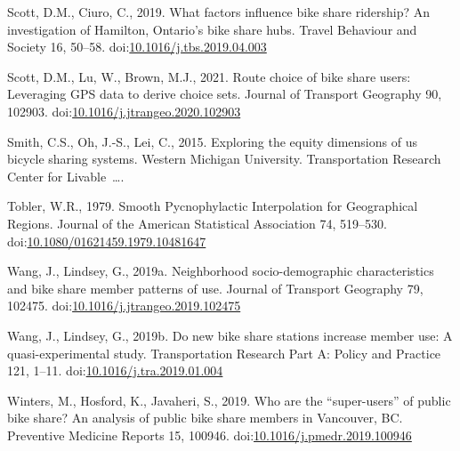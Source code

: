 \documentclass[]{elsarticle} %
\begin{document}
\leavevmode\hypertarget{ref-scottWhatFactorsInfluence2019}{}%
Scott, D.M., Ciuro, C., 2019. What factors influence bike share
ridership? An investigation of Hamilton, Ontario's bike share hubs.
Travel Behaviour and Society 16, 50--58.
doi:\href{https://doi.org/10.1016/j.tbs.2019.04.003}{10.1016/j.tbs.2019.04.003}

\leavevmode\hypertarget{ref-scottRouteChoiceBike2021}{}%
Scott, D.M., Lu, W., Brown, M.J., 2021. Route choice of bike share
users: Leveraging GPS data to derive choice sets. Journal of Transport
Geography 90, 102903.
doi:\href{https://doi.org/10.1016/j.jtrangeo.2020.102903}{10.1016/j.jtrangeo.2020.102903}

\leavevmode\hypertarget{ref-smith2015exploring}{}%
Smith, C.S., Oh, J.-S., Lei, C., 2015. Exploring the equity dimensions
of us bicycle sharing systems. Western Michigan University.
Transportation Research Center for Livable~\ldots.

\leavevmode\hypertarget{ref-toblerSmoothPycnophylacticInterpolation1979}{}%
Tobler, W.R., 1979. Smooth Pycnophylactic Interpolation for Geographical
Regions. Journal of the American Statistical Association 74, 519--530.
doi:\href{https://doi.org/10.1080/01621459.1979.10481647}{10.1080/01621459.1979.10481647}

\leavevmode\hypertarget{ref-wangNeighborhoodSociodemographicCharacteristics2019}{}%
Wang, J., Lindsey, G., 2019a. Neighborhood socio-demographic
characteristics and bike share member patterns of use. Journal of
Transport Geography 79, 102475.
doi:\href{https://doi.org/10.1016/j.jtrangeo.2019.102475}{10.1016/j.jtrangeo.2019.102475}

\leavevmode\hypertarget{ref-wangNewBikeShare2019}{}%
Wang, J., Lindsey, G., 2019b. Do new bike share stations increase member
use: A quasi-experimental study. Transportation Research Part A: Policy
and Practice 121, 1--11.
doi:\href{https://doi.org/10.1016/j.tra.2019.01.004}{10.1016/j.tra.2019.01.004}

\leavevmode\hypertarget{ref-wintersWhoAreSuperusers2019}{}%
Winters, M., Hosford, K., Javaheri, S., 2019. Who are the
``super-users'' of public bike share? An analysis of public bike share
members in Vancouver, BC. Preventive Medicine Reports 15, 100946.
doi:\href{https://doi.org/10.1016/j.pmedr.2019.100946}{10.1016/j.pmedr.2019.100946}
\end{document}
